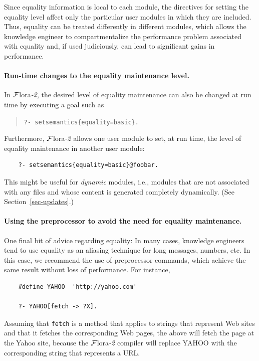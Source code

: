 \documentclass[11pt]{article}
\newcommand{\FLORA}{{\mbox{\sc ${\cal F}${lora}\rm\emph{-2}}}\xspace}
\newcommand{\FLSYSTEM}{\FLORA}
\begin{document}
Since equality information is local to each module, the directives for
setting the equality level affect only the particular user modules in which
they are included.  Thus, equality can be treated differently in different
modules, which allows the knowledge engineer to compartmentalize the performance
problem associated with equality and, if used judiciously, can lead to
significant gains in performance.

\paragraph{Run-time changes to the equality maintenance level.}
In \FLSYSTEM, the desired level of equality maintenance can also be changed at
run time by executing a goal such as
\begin{quote}
 {\tt ?- setsemantics\{equality=basic\}.}
\end{quote}
Furthermore, \FLSYSTEM allows one user module to set, at run time, the level
of equality maintenance in another user module:
\begin{verbatim}
    ?- setsemantics{equality=basic}@foobar.
\end{verbatim}
This might be useful for \emph{dynamic} modules, i.e., modules that
are not associated with any files and whose content is generated completely
dynamically. (See Section~\ref{sec-updates}.)

\paragraph{Using the preprocessor to avoid the need for equality maintenance.}
One final bit of advice regarding equality: In many cases, knowledge
engineers tend to use
equality as an aliasing technique for long messages, numbers, etc. In this
case, we recommend the use of preprocessor commands, which achieve the same
result without loss of performance. For instance,

\begin{verbatim}
    #define YAHOO  'http://yahoo.com'  

    ?- YAHOO[fetch -> ?X].
\end{verbatim}
\noindent
Assuming that {\tt fetch} is a method that applies to strings that
represent Web sites and that it fetches the corresponding Web pages, the above
will fetch the page at the Yahoo site, because the \FLSYSTEM compiler will
replace YAHOO with the corresponding string that represents a URL.
\end{document}
